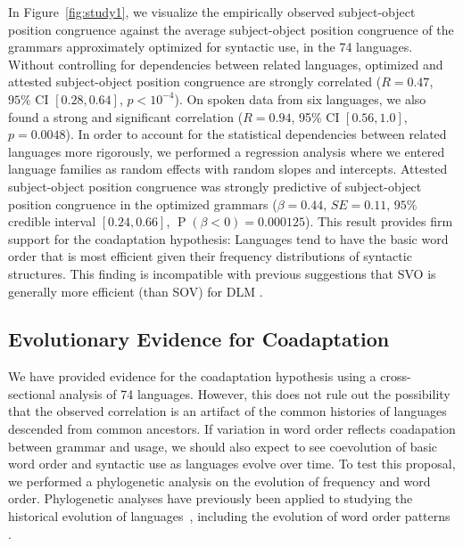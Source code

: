 \documentclass[9pt,twocolumn,twoside,lineno]{pnas-new}
\begin{document}
In Figure~\ref{fig:study1}, we visualize the empirically observed subject-object position congruence against the average subject-object position congruence of the grammars  approximately optimized for syntactic use, in the 74 languages.
Without controlling for dependencies between related languages, optimized and attested subject-object position congruence are strongly correlated ($R=0.47$, $95\%$ CI $[0.28, 0.64]$, $p<10^{-4}$). %
On spoken data from six languages, we also found a strong and significant correlation ($R=0.94$, 95\% CI $[0.56, 1.0]$, $p=0.0048$).
In order to account for the statistical dependencies between related languages more rigorously, we performed a regression analysis where we entered language families as random effects with random slopes and intercepts.
Attested subject-object position congruence was strongly predictive of subject-object position congruence in the optimized grammars ($\beta = 0.44$, $SE=0.11$, $95\%$ credible interval $[0.24, 0.66]$, $\operatorname{P}(\beta<0) = 0.000125$). %
This result provides firm support for the coadaptation hypothesis: Languages tend to have the basic word order that is most efficient given their frequency distributions of syntactic structures.
This finding is incompatible with previous suggestions that SVO is generally more efficient (than SOV) for DLM \citep{ferrer-i-cancho-placement-2017}.







\subsection*{Evolutionary Evidence for Coadaptation}
We have provided evidence for the coadaptation hypothesis using a cross-sectional analysis of 74 languages. %
However, this does not rule out the possibility that the observed correlation is an artifact of the common histories of languages descended from common ancestors.
If variation in word order reflects coadapation between grammar and usage, we should also expect to see coevolution of basic word order and syntactic use as languages evolve over time.
To test this proposal, we performed a phylogenetic analysis on the evolution of frequency and word order.
Phylogenetic analyses have previously been applied to studying the historical evolution of languages~\citep[e.g., ][]{gray2009language,greenhill2009austronesian,chang2015ancestry,sagart2019dated}, including the evolution of word order patterns \citep{dunn-evolved-2011, maurits2014tracing}.
\end{document}
